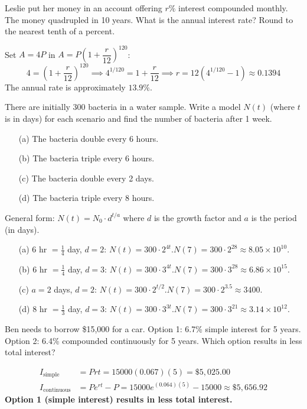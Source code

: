 \documentclass{ximera}
\begin{document}
\begin{problem}
Leslie put her money in an account offering $r\%$ interest compounded monthly. The money quadrupled in 10 years. What is the annual interest rate? Round to the nearest tenth of a percent.

\begin{solution}
Set $A=4P$ in $A=P\!\left(1+\dfrac{r}{12}\right)^{120}$:
$$4 = \left(1+\frac{r}{12}\right)^{120} \implies 4^{1/120} = 1+\frac{r}{12} \implies r = 12\!\left(4^{1/120}-1\right) \approx 0.1394$$
The annual rate is approximately $\mathbf{13.9\%}$.
\end{solution}
\end{problem}


\begin{problem}
There are initially 300 bacteria in a water sample. Write a model $N(t)$ (where $t$ is in days) for each scenario and find the number of bacteria after 1 week.
\begin{enumerate}
  \item[(a)] The bacteria double every 6 hours.
  \item[(b)] The bacteria triple every 6 hours.
  \item[(c)] The bacteria double every 2 days.
  \item[(d)] The bacteria triple every 8 hours.
\end{enumerate}

\begin{solution}
General form: $N(t) = N_0\cdot d^{t/a}$ where $d$ is the growth factor and $a$ is the period (in days).
\begin{enumerate}
  \item[(a)] 6 hr $= \tfrac{1}{4}$ day, $d=2$: $N(t)=300\cdot 2^{4t}$.\quad $N(7)=300\cdot 2^{28}\approx 8.05\times10^{10}$.
  \item[(b)] 6 hr $= \tfrac{1}{4}$ day, $d=3$: $N(t)=300\cdot 3^{4t}$.\quad $N(7)=300\cdot 3^{28}\approx 6.86\times10^{15}$.
  \item[(c)] $a=2$ days, $d=2$: $N(t)=300\cdot 2^{t/2}$.\quad $N(7)=300\cdot 2^{3.5}\approx 3400$.
  \item[(d)] 8 hr $= \tfrac{1}{3}$ day, $d=3$: $N(t)=300\cdot 3^{3t}$.\quad $N(7)=300\cdot 3^{21}\approx 3.14\times10^{12}$.
\end{enumerate}
\end{solution}
\end{problem}


\begin{problem}
Ben needs to borrow \$15,000 for a car. Option 1: 6.7\% simple interest for 5 years. Option 2: 6.4\% compounded continuously for 5 years. Which option results in less total interest?

\begin{solution}
\begin{align*}
  I_{\text{simple}} &= Prt = 15000(0.067)(5) = \$5{,}025.00\\
  I_{\text{continuous}} &= Pe^{rt}-P = 15000e^{(0.064)(5)}-15000 \approx \$5{,}656.92
\end{align*}
\textbf{Option 1 (simple interest) results in less total interest.}
\end{solution}
\end{problem}
\end{document}
